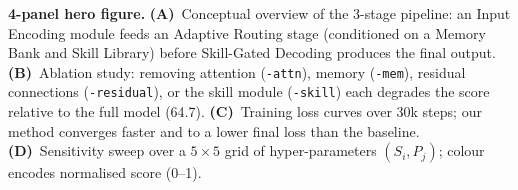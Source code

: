 \caption{\textbf{4-panel hero figure.}
\textbf{(A)}~Conceptual overview of the 3-stage pipeline: an Input Encoding module feeds an
Adaptive Routing stage (conditioned on a Memory Bank and Skill Library) before Skill-Gated
Decoding produces the final output.
\textbf{(B)}~Ablation study: removing attention (\texttt{-attn}), memory (\texttt{-mem}),
residual connections (\texttt{-residual}), or the skill module (\texttt{-skill}) each degrades
the score relative to the full model (64.7).
\textbf{(C)}~Training loss curves over 30k steps; our method converges faster and to a lower
final loss than the baseline.
\textbf{(D)}~Sensitivity sweep over a $5{\times}5$ grid of hyper-parameters $(S_i, P_j)$;
colour encodes normalised score (0--1).}
